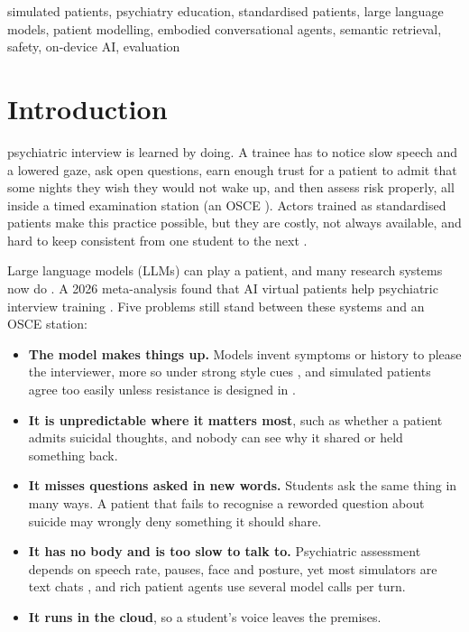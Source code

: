 \documentclass[journal]{IEEEtran}
\begin{document}
\begin{IEEEkeywords}
simulated patients, psychiatry education, standardised patients, large language models, patient modelling, embodied conversational agents,
semantic retrieval, safety, on-device AI, evaluation
\end{IEEEkeywords}

\section{Introduction}
 psychiatric interview is learned by doing. A trainee has to notice slow speech and a lowered gaze, ask open questions,
earn enough trust for a patient to admit that some nights they wish they would not wake up, and then assess risk properly, all inside a timed
examination station (an OSCE \cite{harden1975osce}). Actors trained as standardised patients make this practice possible, but they are costly,
not always available, and hard to keep consistent from one student to the next \cite{piot2021simulation}.

Large language models (LLMs) can play a patient, and many research systems now do
\cite{chen2023llmempowered,wang2024patient,lee2025psyche,sabour2026patientact,sabour2026patienthub,louie2024roleplaydoh}. A 2026
meta-analysis found that AI virtual patients help psychiatric interview training \cite{kilincel2026meta}. Five problems still stand between
these systems and an OSCE station:
\begin{itemize}
\item \textbf{The model makes things up.} Models invent symptoms or history to please the interviewer, more so under strong style cues
\cite{chen2023llmempowered}, and simulated patients agree too easily unless resistance is designed in \cite{steenstra2025scaffolding,lee2025psyche}.
\item \textbf{It is unpredictable where it matters most}, such as whether a patient admits suicidal thoughts, and nobody can see why it shared
or held something back.
\item \textbf{It misses questions asked in new words.} Students ask the same thing in many ways. A patient that fails to recognise a reworded
question about suicide may wrongly deny something it should share.
\item \textbf{It has no body and is too slow to talk to.} Psychiatric assessment depends on speech rate, pauses, face and posture, yet most
simulators are text chats \cite{wang2024patient,lee2025psyche,sabour2026patientact}, and rich patient agents use several model calls per turn.
\item \textbf{It runs in the cloud}, so a student's voice leaves the premises.
\end{itemize}
\end{document}
